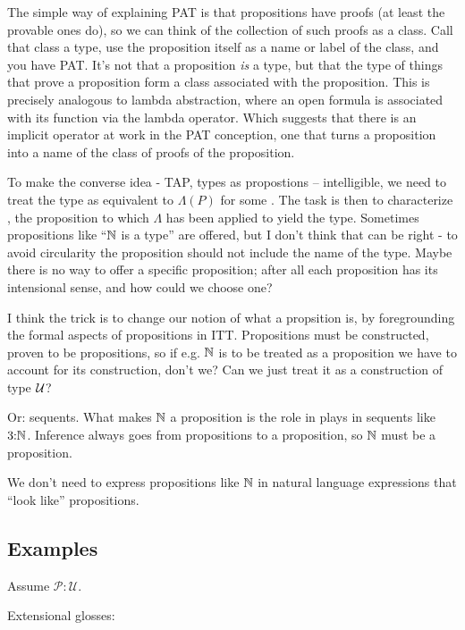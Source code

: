 \documentclass{article}
\begin{document}
The simple way of explaining PAT is that propositions have proofs (at
least the provable ones do), so we can think of the collection of such
proofs as a class.  Call that class a type, use the proposition itself
as a name or label of the class, and you have PAT.  It's not that a
proposition \emph{is} a type, but that the type of things that prove a
proposition form a class associated with the proposition.  This is
precisely analogous to lambda abstraction, where an open formula is
associated with its function via the lambda operator.  Which suggests
that there is an implicit operator at work in the PAT conception, one
that turns a proposition into a name of the class of proofs of the
proposition.

To make the converse idea - TAP, types as propostions -- intelligible,
we need to treat the type as equivalent to \(\Lambda(P)\) for some
\PropP.  The task is then to characterize \PropP, the proposition to
which \(\Lambda\) has been applied to yield the type.  Sometimes
propositions like ``\(\mathbb{N}\) is a type'' are offered, but I don't
think that can be right - to avoid circularity the proposition should
not include the name of the type.  Maybe there is no way to offer a
specific proposition; after all each proposition has its intensional
sense, and how could we choose one?

I think the trick is to change our notion of what a propsition is, by
foregrounding the formal aspects of propositions in ITT.  Propositions
must be constructed, proven to be propositions, so if e.g. \(\mathbb{N}\) is
to be treated as a proposition we have to account for its
construction, don't we?  Can we just treat it as a construction of
type \(\mathcal{U}\)?

Or: sequents.  What makes \(\mathbb{N}\) a proposition is the role in plays
in sequents like \(3{:}\mathbb{N}\).  Inference always goes from
propositions to a proposition, so \(\mathbb{N}\) must be a proposition.

We don't need to express propositions like \(\mathbb{N}\) in natural
language expressions that ``look like'' propositions.

\subsection{Examples}
Assume \(\mathcal{P{:}U}\).
\medskip

\noindent Extensional glosses:
\end{document}
